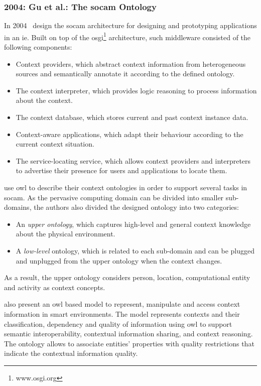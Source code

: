 \subsubsection{2004: Gu et al.: The \ac{socam} Ontology}
\label{sec:gu}

In 2004~\citet{gu_toward_2004} design the \acf{socam} architecture for designing 
and prototyping applications in an \ac{ie}. Built on top of the 
\ac{osgi}\footnote{www.osgi.org} architecture, such middleware consisted of the 
following components:

\begin{itemize}
  \item Context providers, which abstract context information from heterogeneous
  sources and semantically annotate it according to the defined ontology.
  \item The context interpreter, which provides logic reasoning to process
  information about the context.
  \item The context database, which stores current and past context instance data.
  \item Context-aware applications, which adapt their behaviour according to the
  current context situation.
  \item The service-locating service, which allows context providers and 
  interpreters to advertise their presence for users and applications to locate 
  them.
\end{itemize}

\citeauthor{gu_toward_2004} use \ac{owl} to describe their context ontologies 
in order to support several tasks in \ac{socam}. As the pervasive computing 
domain can be divided into smaller sub-domains, the authors also divided the 
designed ontology into two categories: 

\begin{itemize}
  \item An \textit{upper ontology}, which captures high-level and general 
  context knowledge about the physical environment.
  \item A \textit{low-level} ontology, which is related to each sub-domain and 
  can be plugged and unplugged from the upper ontology when the context changes.
\end{itemize}

As a result, the upper ontology considers person, location, computational entity
and activity as context concepts.

\citet{gu_ontology_based_2004} also present an \ac{owl} based model to represent, 
manipulate and access context information in smart environments. The model 
represents contexts and their classification, dependency and quality of
information using \ac{owl} to support semantic interoperability, contextual 
information sharing, and context reasoning. The ontology allows to associate 
entities' properties with quality restrictions that indicate the contextual 
information quality. 